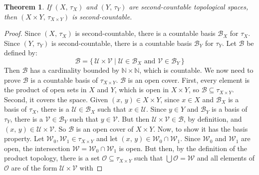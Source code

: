 \documentclass{article}
\theoremstyle{plain}
\newtheorem{theorem}{Theorem}[section]
\theoremstyle{normal}
\begin{document}
        \begin{theorem}
            If $(X,\,\tau_{X})$ and $(Y,\,\tau_{Y})$ are second-countable
            topological spaces, then $(X\times{Y},\,\tau_{X\times{Y}})$ is
            second-countable.
        \end{theorem}
        \begin{proof}
            Since $(X,\,\tau_{X})$ is second-countable, there is a countable
            basis $\mathcal{B}_{X}$ for $\tau_{X}$. Since $(Y,\,\tau_{Y})$ is
            second-countable, there is a countable basis $\mathcal{B}_{Y}$ for
            $\tau_{Y}$. Let $\mathcal{B}$ be defined by:
            \begin{equation}
                \mathcal{B}=
                    \{\,\mathcal{U}\times\mathcal{V}\;|\;
                    \mathcal{U}\in\mathcal{B}_{X}\textrm{ and }
                    \mathcal{V}\in\mathcal{B}_{Y}\,\}
            \end{equation}
            Then $\mathcal{B}$ has a cardinality bounded by
            $\mathbb{N}\times\mathbb{N}$, which is countable. We now need to
            prove $\mathcal{B}$ is a countable basis of $\tau_{X\times{Y}}$.
            $\mathcal{B}$ is an open cover. First, every element is the
            product of open sets in $X$ and $Y$, which is open in
            $X\times{Y}$, so $\mathcal{B}\subseteq\tau_{X\times{Y}}$. Second,
            it covers the space. Given $(x,\,y)\in{X}\times{Y}$, since
            $x\in{X}$ and $\mathcal{B}_{X}$ is a basis of $\tau_{X}$, there is
            a $\mathcal{U}\in\mathcal{B}_{X}$ such that $x\in\mathcal{U}$.
            Since $y\in{Y}$ and $\mathcal{B}_{Y}$ is a basis of $\tau_{Y}$,
            there is a $\mathcal{V}\in\mathcal{B}_{Y}$ such that
            $y\in\mathcal{V}$. But then
            $\mathcal{U}\times\mathcal{V}\in\mathcal{B}$, by definition, and
            $(x,\,y)\in\mathcal{U}\times\mathcal{V}$. So $\mathcal{B}$ is an
            open cover of $X\times{Y}$. Now, to show it has the basis property.
            Let $\mathcal{W}_{0},\mathcal{W}_{1}\in\tau_{X\times{Y}}$ and
            let $(x,\,y)\in\mathcal{W}_{0}\cap\mathcal{W}_{1}$. Since
            $\mathcal{W}_{0}$ and $\mathcal{W}_{1}$ are open, the intersection
            $\mathcal{W}=\mathcal{W}_{0}\cap\mathcal{W}_{1}$ is open. But
            then, by the definition of the product topology, there is a
            set $\mathcal{O}\subseteq\tau_{X\times{Y}}$ such that
            $\bigcup\mathcal{O}=\mathcal{W}$ and all elements of
            $\mathcal{O}$ are of the form $\mathcal{U}\times\mathcal{V}$ with

\end{proof}
\end{document}

